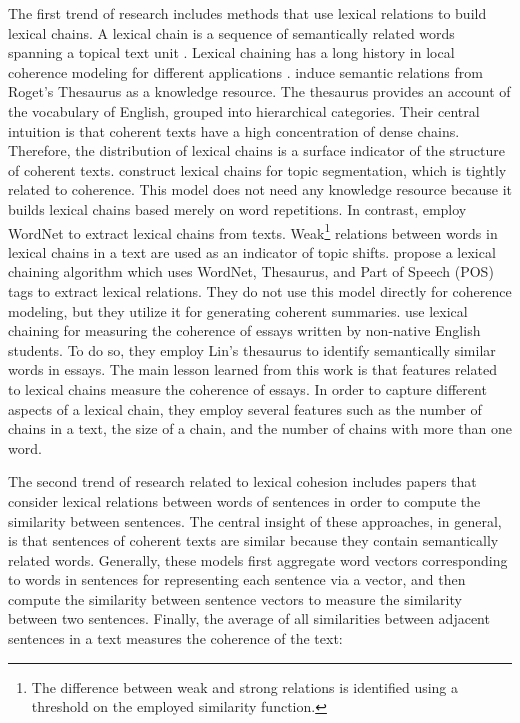 The first trend of research includes methods that use lexical relations to build lexical chains. 
A lexical chain is a sequence of semantically related words spanning a topical text unit \cite{morris91}. 
Lexical chaining has a long history in local coherence modeling for different applications \cite{morris91,fenglijun09,wongbillytm12,benguosheng13,flor13}. 
 induce semantic relations from Roget's Thesaurus as a knowledge resource. 
The thesaurus provides an account of the vocabulary of English, grouped into hierarchical categories. 
Their central intuition is that coherent texts have a high concentration of dense chains. 
Therefore, the distribution of lexical chains is a surface indicator of the structure of coherent texts. 
 construct lexical chains for topic segmentation, which is tightly related to coherence. 
This model does not need any knowledge resource because it builds lexical chains based merely on word repetitions. 
In contrast,  employ WordNet to extract lexical chains from texts.  
Weak\footnote{The difference between weak and strong relations is identified using a threshold on the employed similarity function.} relations between words in lexical chains in a text are used as an indicator of topic shifts.  
 propose a lexical chaining algorithm which uses WordNet, Thesaurus, and Part of Speech (POS) tags to extract lexical relations. 
They do not use this model directly for coherence modeling, but they utilize it for generating coherent summaries. 
 use lexical chaining for measuring the coherence of essays written by non-native English students. 
To do so, they employ Lin’s thesaurus \cite{lindekang98} to identify semantically similar words in essays.   
The main lesson learned from this work is that features related to lexical chains measure the coherence of essays. 
In order to capture different aspects of a lexical chain, they employ several features such as the number of chains in a text, the size of a chain, and the number of chains with more than one word. 

The second trend of research related to lexical cohesion includes papers that consider lexical relations between words of sentences in order to compute the similarity between sentences.    
The central insight of these approaches, in general, is that sentences of coherent texts are similar because they contain semantically related words. 
Generally, these models first aggregate word vectors corresponding to words in sentences for representing each sentence via a vector, and then compute the similarity between sentence vectors to measure the similarity between two sentences.  
Finally, the average of all similarities between adjacent sentences in a text measures the coherence of the text: 

